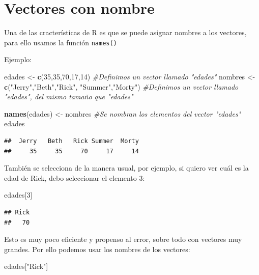 \documentclass[
]{book}
\newenvironment{Shaded}{\begin{snugshade}}{\end{snugshade}}
\newcommand{\CommentTok}[1]{\textcolor[rgb]{0.56,0.35,0.01}{\textit{#1}}}
\newcommand{\DecValTok}[1]{\textcolor[rgb]{0.00,0.00,0.81}{#1}}
\newcommand{\FunctionTok}[1]{\textcolor[rgb]{0.13,0.29,0.53}{\textbf{#1}}}
\newcommand{\NormalTok}[1]{#1}
\newcommand{\OtherTok}[1]{\textcolor[rgb]{0.56,0.35,0.01}{#1}}
\newcommand{\StringTok}[1]{\textcolor[rgb]{0.31,0.60,0.02}{#1}}
\begin{document}
\section{Vectores con nombre}\label{vectores-con-nombre}

Una de las cracterísticas de R es que se puede asignar nombres a los vectores, para ello usamos la función \texttt{names()}

Ejemplo:

\begin{Shaded}
\begin{Highlighting}[]
\NormalTok{edades }\OtherTok{\textless{}{-}} \FunctionTok{c}\NormalTok{(}\DecValTok{35}\NormalTok{,}\DecValTok{35}\NormalTok{,}\DecValTok{70}\NormalTok{,}\DecValTok{17}\NormalTok{,}\DecValTok{14}\NormalTok{) }\CommentTok{\#Definimos un vector llamado "edades"}
\NormalTok{nombres }\OtherTok{\textless{}{-}} \FunctionTok{c}\NormalTok{(}\StringTok{"Jerry"}\NormalTok{,}\StringTok{"Beth"}\NormalTok{,}\StringTok{"Rick"}\NormalTok{, }\StringTok{"Summer"}\NormalTok{,}\StringTok{"Morty"}\NormalTok{) }\CommentTok{\#Definimos un vector llamado "edades", del mismo tamaño que "edades"}

\FunctionTok{names}\NormalTok{(edades) }\OtherTok{\textless{}{-}}\NormalTok{ nombres }\CommentTok{\#Se nombran los elementos del vector "edades"}
\NormalTok{edades}
\end{Highlighting}
\end{Shaded}

\begin{verbatim}
##  Jerry   Beth   Rick Summer  Morty 
##     35     35     70     17     14
\end{verbatim}

También se selecciona de la manera usual, por ejemplo, si quiero ver cuál es la edad de Rick, debo seleccionar el elemento 3:

\begin{Shaded}
\begin{Highlighting}[]
\NormalTok{edades[}\DecValTok{3}\NormalTok{]}
\end{Highlighting}
\end{Shaded}

\begin{verbatim}
## Rick 
##   70
\end{verbatim}

Esto es muy poco eficiente y propenso al error, sobre todo con vectores muy grandes. Por ello podemos usar los nombres de los vectores:

\begin{Shaded}
\begin{Highlighting}[]
\NormalTok{edades[}\StringTok{"Rick"}\NormalTok{]}
\end{Highlighting}
\end{Shaded}
\end{document}
